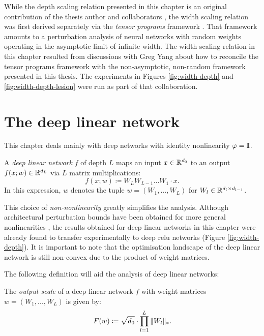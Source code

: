 \begin{refsection}
While the depth scaling relation presented in this chapter is an original contribution of the thesis author and collaborators \citep{my-fromage}, the width scaling relation was first derived separately via the \textit{tensor programs} framework \citep{yang2021tuning}. That framework amounts to a perturbation analysis of neural networks with random weights operating in the asymptotic limit of infinite width. The width scaling relation in this chapter resulted from discussions with Greg Yang about how to reconcile the tensor programs framework with the non-asymptotic, non-random framework presented in this thesis. The experiments in Figures \ref{fig:width-depth} and \ref{fig:width-depth-lesion} were run as part of that collaboration.

\section{The deep linear network}

This chapter deals mainly with deep networks with identity nonlinearity $\varphi = \mathbf{I}$.
\begin{definition}\label{def:dln}
A \textit{deep linear network} $f$ of depth $L$ maps an input $x\in\mathbb{R}^{d_0}$ to an output $f(x;w) \in \mathbb{R}^{d_L}$ via $L$ matrix multiplications:
\begin{equation}\label{eq:dln}
f(x; w) \coloneqq W_L W_{L - 1} \dots W_1 \cdot x.
\end{equation}
In this expression, $w$ denotes the tuple $w = (W_1,...,W_L)$ for $W_l\in \mathbb{R}^{d_l\times d_{l-1}}$.
\end{definition}
This choice of \textit{non-nonlinearity} greatly simplifies the analysis. Although architectural perturbation bounds have been obtained for more general nonlinearities \citep{my-fromage}, the results obtained for deep linear networks in this chapter were already found to transfer experimentally to deep relu networks (Figure \ref{fig:width-depth}). It is important to note that the optimisation landscape of the deep linear network is still non-convex due to the product of weight matrices.

The following definition will aid the analysis of deep linear networks:
\begin{definition}\label{def:output-scale}
The \textit{output scale} of a deep linear network $f$ with weight matrices $w = (W_1,...,W_L)$ is given by:
\begin{equation}
F(w) \coloneqq \sqrt{d_0}\cdot\prod_{l=1}^L \Vert {W_l} \Vert_*.
\end{equation}
\end{definition}


\end{refsection}
